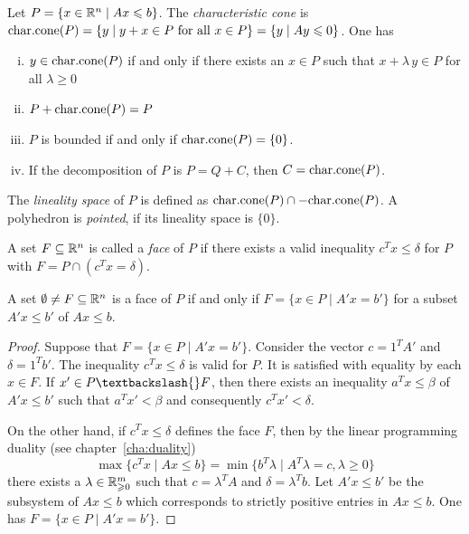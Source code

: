 Let $P = \{ x \in \mathbb{R}^n \mid Ax\leqslant b\}$. The \emph{characteristic cone} is 
$\mathrm{char.cone}(P) =\{ y \mid y+x \in P \text{ for all } x \in P\} = \{y \mid Ay
\leqslant0\}$. One has
\begin{enumerate}[i)]
\item $y \in \mathrm{char.cone}(P)$ if and only if there exists an $x \in P$ such
  that $x + \lambda\,y \in P$ for all $\lambda\geq0$ 
\item $P + \mathrm{char.cone}(P)=P$
\item $P$ is bounded if and only if $\mathrm{char.cone}(P)=\{0\}$. 
\item If the decomposition of $P$ is $P = Q +C$, then $C = \mathrm{char.cone}(P)$. 
\end{enumerate}



The \emph{lineality space} of $P$ is defined as $\mathrm{char.cone}(P) \cap -
\mathrm{char.cone}(P)$. A polyhedron is \emph{pointed}, if its lineality space is
$\{0\}$.






\begin{definition}
  \label{def:f4}
  A set $F\subseteq\mathbb{R}^n$ is called a \emph{face} of $P$ if there exists a
  valid inequality $c^Tx\leq\delta$ for $P$ with $F = P \cap (c^Tx = \delta)$. 
\end{definition}
 
\begin{lemma}
  \label{po:lem:4}
  A set $\emptyset \neq F \subseteq \mathbb{R}^n$ is a face of $P$
  if and only if $F = \{ x \in P \mid A'x = b'\}$ for a subset $A'x\leq b'$ of $Ax\leq b$.
\end{lemma}

\begin{proof}
  Suppose that $F = \{ x \in P \mid A'x = b'\}$. Consider the vector $c =
  1^TA'$ and $\delta = 1^Tb'$. The inequality $c^Tx\leq \delta$ is valid for
  $P$. It is satisfied with equality by each $x \in F$. If $x' \in P\textbackslash{}
  F$, then there exists an inequality $a^Tx\leq\beta$ of $A'x\leq b'$ such
  that $ a^Tx' < \beta$ and consequently $c^Tx'<\delta$. 

  On the other hand, if $c^Tx\leq\delta$ defines the face $F$,
  then by the linear programming duality (see chapter~\ref{cha:duality})
  \[ \max\{ c^Tx \mid Ax\leq b \} = \min\{ b^T\lambda \mid A^T\lambda = c, \lambda \geq 0 \} \]
  there exists a $\lambda \in \mathbb{R}^m_{\geqslant 0}$ such that $c=\lambda^TA$ and $\delta = \lambda^Tb$.
  Let $A'x\leq b'$ be the
  subsystem of $Ax\leq b$ which corresponds to strictly positive entries
  in $Ax\leq b$. One has $F = \{ x \in P \mid A'x = b'\}$. 
\end{proof}





